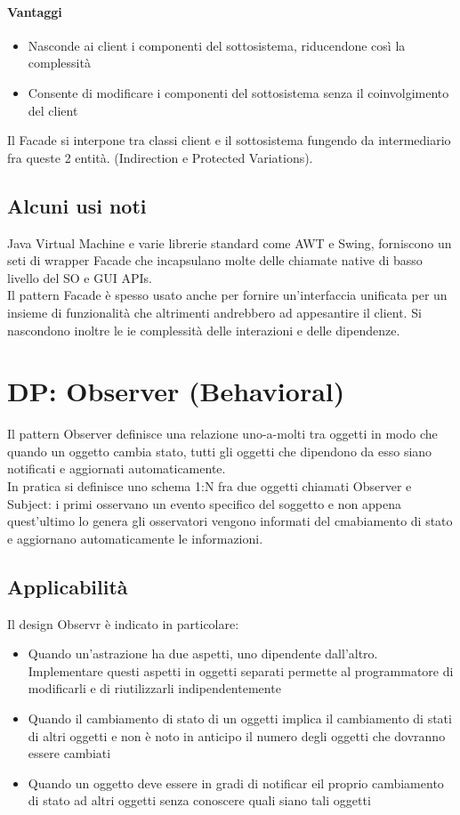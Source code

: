 \paragraph*{Vantaggi}
\begin{itemize}
    \item Nasconde ai client i componenti del sottosistema, riducendone così la complessità
    \item Consente di modificare i componenti del sottosistema senza il coinvolgimento del client
\end{itemize}
Il Facade si interpone tra classi client e il sottosistema fungendo da intermediario fra queste 2 entità.
(Indirection e Protected Variations).
\subsection*{Alcuni usi noti}
Java Virtual Machine e varie librerie standard come AWT e Swing, forniscono un seti di
wrapper Facade che incapsulano molte delle chiamate native di basso livello del SO e GUI APIs. \\
Il pattern Facade è spesso usato anche per fornire un'interfaccia unificata per un insieme di funzionalità
che altrimenti andrebbero ad appesantire il client. Si nascondono inoltre le ie complessità delle
interazioni e delle dipendenze.
\section{DP: Observer (Behavioral)}
Il pattern Observer definisce una relazione uno-a-molti tra oggetti in modo che quando un oggetto
cambia stato, tutti gli oggetti che dipendono da esso siano notificati e aggiornati automaticamente.\\
In pratica si definisce uno schema 1:N fra due oggetti chiamati Observer e Subject: i primi
osservano un evento specifico del soggetto e non appena quest'ultimo lo genera gli osservatori
vengono informati del cmabiamento di stato e aggiornano automaticamente le informazioni.
\subsection*{Applicabilità}
Il design Observr è indicato in particolare:
\begin{itemize}
    \item Quando un'astrazione ha due aspetti, uno dipendente dall'altro. Implementare questi
    aspetti in oggetti separati permette al programmatore di modificarli e di riutilizzarli
    indipendentemente
    \item Quando il cambiamento di stato di un oggetti implica il cambiamento di stati di altri oggetti
    e non è noto in anticipo il numero degli oggetti che dovranno essere cambiati
    \item Quando un oggetto deve essere in gradi di notificar eil proprio cambiamento di stato
    ad altri oggetti senza conoscere quali siano tali oggetti
\end{itemize}
